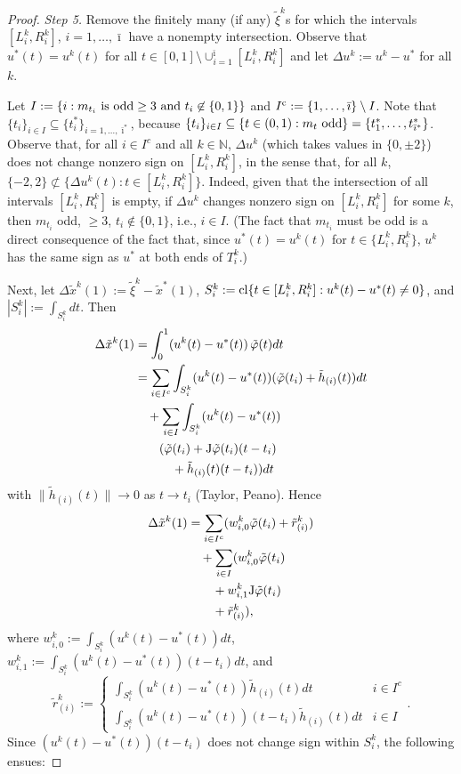 \documentclass[letterpaper,10pt,conference]{ieeeconf}
\def\N{{\mathbb{N}}}
\begin{document}
\begin{proof}
\smallskip\noindent
{\em Step 5.}
Remove the finitely many (if any) $\tilde\xi^k$s for which the intervals
$[L_i^k,R_i^k]$, $i=1,\ldots, \bar\imath$ have a nonempty intersection.
Observe that $u^*(t)=u^k(t)$ 
for all $t\in[0,1]\setminus\cup_{i=1}^{\bar\imath}[L_i^k,R_i^k]$ and
let $\Delta u^k:=u^k-u^*$ for all $k$.

Let $I:=\{i: m_{t_i}{\rm ~is~odd}\geq3 {\rm ~and~} t_i\not\in\{0,1\}\}$
and $I^{\rm c}:=\{1,\ldots,\bar\imath\}\setminus I$.
Note that 
$\{t_i\}_{i\in I}\subseteq\{t_i^*\}_{i=1,\ldots,\bar\imath^*}$,
because 
$\{t_i\}_{i\in I}
\subseteq\{t\in(0,1):m_t{\rm ~odd}\}=\{t_1^*,\ldots,t_{\bar\imath^*}^*\}$.
Observe that, for all $i\in I^c$ and all $k\in\N$, $\Delta u^k$ 
(which takes values in $\{0,\pm2\}$) does not 
change nonzero sign on $[L_i^k,R_i^k]$, in the sense that, for all $k$,
$\{-2,2\}\not\subset\{\Delta u^k(t):t\in[L_i^k,R_i^k]\}$.
Indeed, given that the intersection of all intervals $[L_i^k,R_i^k]$ is
empty, if $\Delta u^k$ changes nonzero sign on $[L_i^k,R_i^k]$ for some $k$, 
then $m_{t_i}$ odd, $\geq3$, $t_i\not\in\{0,1\}$, i.e., $i\in I$.
(The fact that $m_{t_i}$ must be odd is a direct consequence of the fact
that, since $u^*(t)=u^k(t)$ for $t\in\{L_i^k,R_i^k\}$, $u^k$ has the same 
sign as $u^*$ at both ends of $T_i^k$.)

Next, let $\Delta\tilde x^k(1):=\tilde\xi^k-\tilde x^*(1)$,
$S_i^k:={\rm cl}\{t\in[L_i^k,R_i^k]:u^k(t)-u^*(t)\not=0\}$,
and $|S_i^k|:=\int_{S_i^k}dt$.
Then 
\[
\begin{aligned}
\Delta\tilde x^k(1)&=\int_0^1(u^k(t)-u^*(t))\,\tilde\varphi(t)dt\\
&=\sum_{i\in I^c}\int_{S_i^k}(u^k(t)-u^*(t))
(\tilde\varphi(t_i)+\tilde h_{(i)}(t))dt\\
&\quad+\sum_{i\in I} \int_{S_i^k}(u^k(t)-u^*(t))\\
&\qquad(\tilde\varphi(t_i)+{\rm J}\tilde\varphi(t_i)(t-t_i)\\
&\qquad\quad+\tilde h_{(i)}(t)(t-t_i))dt
\end{aligned}
\]
with $\|\tilde h_{(i)}(t)\|\to0$ as $t\to t_i$ (Taylor, Peano).  Hence
\[
\begin{aligned}
\Delta\tilde x^k(1) &= \sum_{i\in I^c} (w_{i,0}^k\tilde\varphi(t_i) + \tilde r_{(i)}^k)\\
&\quad+\sum_{i\in I}
(w_{i,0}^k\tilde\varphi(t_i)\\
&\qquad+ w_{i,1}^k{\rm J}\tilde\varphi(t_i)\\
&\qquad+ \tilde r_{(i)}^k),
\end{aligned}
\]
where $w_{i,0}^k:=\int_{S_i^k}(u^k(t)-u^*(t))dt$,~
$w_{i,1}^k:=\int_{S_i^k}(u^k(t)-u^*(t))(t-t_i)dt$, and
\[
\tilde r_{(i)}^k:=
\begin{cases}
\int_{S_i^k}(u^k(t)-u^*(t))\tilde h_{(i)}(t)dt & i\in I^c \\
\int_{S_i^k}(u^k(t)-u^*(t))(t-t_i)\tilde h_{(i)}(t)dt & i\in I
\end{cases}
.
\]
Since $(u^k(t)-u^*(t))(t-t_i)$ does not change sign within $S_i^k$, the following 
ensues: 


\end{proof}
\end{document}
